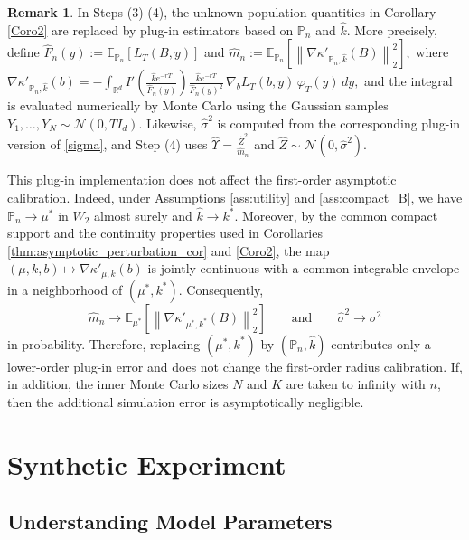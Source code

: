 \documentclass[11pt]{article}
\theoremstyle{definition}
\newtheorem{remark}{Remark}
\newcommand{\E}{\mathbb{E}}
\begin{document}
\begin{remark}
{In Steps (3)-(4), the unknown population quantities in Corollary \ref{Coro2} are replaced by plug-in estimators based on $\mathbb{P}_n$ and $\hat{k}$. More precisely, define $\widehat{F}_n(y):=\E_{\mathbb{P}_n}[L_T(B,y)]$ and $\widehat m_n:=\E_{\mathbb{P}_n}\!\left[\left\|\nabla \kappa'_{\mathbb{P}_n,\hat{k}}(B)\right\|_2^2\right],$
where $\nabla \kappa'_{\mathbb{P}_n,\hat{k}}(b)
=
-\int_{\mathbb{R}^d}
I'\!\left(\frac{\hat{k}e^{-rT}}{\widehat{F}_n(y)}\right)
\frac{\hat{k}e^{-rT}}{\widehat{F}_n(y)^2}
\,\nabla_b L_T(b,y)\,\varphi_T(y)\,dy,$
and the integral is evaluated numerically by Monte Carlo using the Gaussian samples
$Y_1,\ldots,Y_N\sim\mathcal{N}(0,TI_d)$. Likewise, $\hat{\sigma}^2$ is computed from the corresponding
plug-in version of \eqref{sigma}, and Step (4) uses $\hat{\Upsilon}=\frac{\hat{Z}^2}{\widehat m_n}$ and $\hat{Z}\sim\mathcal{N}(0,\hat{\sigma}^2).$}

{This plug-in implementation does not affect the first-order asymptotic calibration. Indeed, under
Assumptions \ref{ass:utility} and \ref{ass:compact_B}, we have
$\mathbb{P}_n\to\mu^*$ in $W_2$ almost surely and $\hat{k}\to k^*$. Moreover, by the common
compact support and the continuity properties used in Corollaries \ref{thm:asymptotic_perturbation_cor}
and \ref{Coro2}, the map $(\mu,k,b)\longmapsto \nabla \kappa'_{\mu,k}(b)$
is jointly continuous with a common integrable envelope in a neighborhood of
$(\mu^*,k^*)$. Consequently,
\[
\widehat m_n
\to
\E_{\mu^*}\!\left[\left\|\nabla \kappa'_{\mu^*,k^*}(B)\right\|_2^2\right]
\qquad\text{and}\qquad
\hat{\sigma}^2\to \sigma^2
\]
in probability. Therefore, replacing $(\mu^*,k^*)$ by $(\mathbb{P}_n,\hat{k})$ contributes only a
lower-order plug-in error and does not change the first-order radius calibration. If, in addition,
the inner Monte Carlo sizes $N$ and $K$ are taken to infinity with $n$, then the additional simulation
error is asymptotically negligible.}
\end{remark}


\section{Synthetic Experiment}\label{syn}


\subsection{Understanding Model Parameters}
\label{param}
\end{document}
